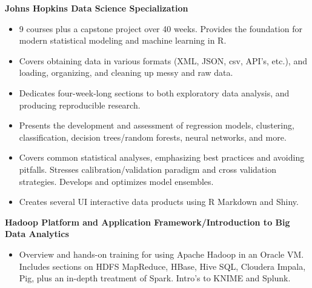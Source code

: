 \documentclass[margin,10pt]{res} %
\begin{document}
\begin{resume}
\textbf{Johns Hopkins Data Science Specialization}\\%
\begin{itemize} %
\item 9 courses plus a capstone project over 40 weeks. Provides the foundation for modern statistical modeling and machine learning in R. 
\item Covers obtaining data in various formats (XML, JSON, csv, API's, etc.), and loading, organizing, and cleaning up messy and raw data. 
\item Dedicates four-week-long sections to both exploratory data analysis, and producing reproducible research.
\item Presents the development and assessment of regression models, clustering, \\ classification, decision trees/random forests, neural networks, and more.
\item Covers common statistical analyses, emphasizing best practices and avoiding pitfalls. Stresses calibration/validation paradigm and cross validation strategies. Develops and optimizes model ensembles.
\item Creates several UI interactive data products using R Markdown and Shiny. 
\end{itemize}
\textbf{Hadoop Platform and Application Framework/Introduction to Big Data Analytics}%
\href{https://www.coursera.org/account/accomplishments/records/D9NUDER78DK6}{} \\
\begin{itemize} %
\item Overview and hands-on training for using Apache Hadoop in an Oracle VM. Includes sections on HDFS MapReduce, HBase, Hive SQL, Cloudera Impala, Pig, plus an in-depth treatment of Spark. Intro's to KNIME and Splunk.%

\end{itemize}
\end{resume}
\end{document}
